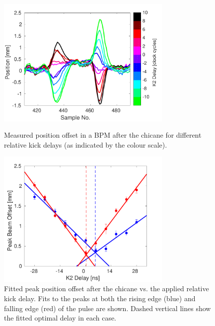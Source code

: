 \begin{figure}
  \centering
  \includegraphics[width=0.75\textwidth]{Figures/commissioning/relDelay_traces}
  \caption{Measured position offset in a BPM after the chicane for different relative kick delays (as indicated by the colour scale).}
  \label{f:relDelay_traces}

  \includegraphics[width=0.75\textwidth]{Figures/commissioning/relDelay_fit}
  \caption{Fitted peak position offset after the chicane vs. the applied relative kick delay. Fits to the peaks at both the rising edge (blue) and falling edge (red) of the pulse are shown. Dashed vertical lines show the fitted optimal delay in each case.}
  \label{f:relDelay_fit}
\end{figure}


